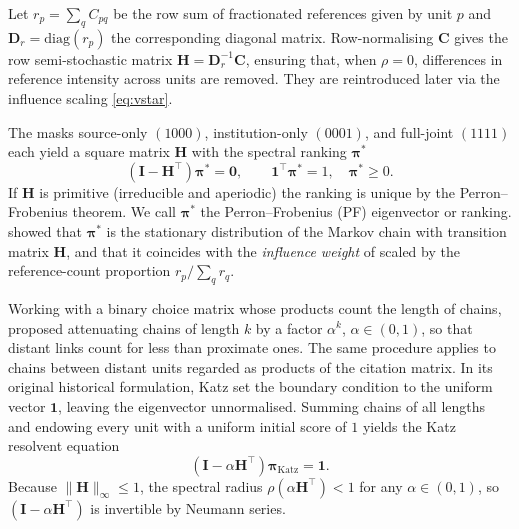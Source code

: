 Let $r_p=\sum_q C_{pq}$ be the row sum of fractionated references given by unit $p$
and $\mathbf{D}_r=\mathrm{diag}(r_p)$ the corresponding diagonal matrix.
Row-normalising $\mathbf{C}$ gives the row semi-stochastic matrix
$\mathbf{H}=\mathbf{D}_r^{-1}\mathbf{C}$, ensuring that, when $\rho = 0$, differences in reference intensity across units are removed. They are reintroduced later
via the influence scaling \eqref{eq:vstar}. 

The masks source-only $(1000)$, institution-only $(0001)$, and full-joint $(1111)$
each yield a square matrix $\mathbf{H}$ with the spectral
ranking $\boldsymbol{\pi}^*$ \citep[see][for an overview]{vignaSpectralRanking2016}
\begin{equation}
	(\mathbf{I} - \mathbf{H}^\top)\boldsymbol{\pi}^* = \mathbf{0},
	\qquad
	\mathbf{1}^\top\boldsymbol{\pi}^*=1,
	\quad
	\boldsymbol{\pi}^*\ge 0.
	\label{eq:eig}
\end{equation}
If $\mathbf{H}$ is primitive (irreducible and aperiodic) the ranking is unique by the
Perron--Frobenius theorem. We call $\boldsymbol{\pi}^*$ the Perron--Frobenius (PF) eigenvector or ranking. \textcite{gellerCitationInfluenceMethodology1978} showed that
$\boldsymbol{\pi}^*$ is the stationary distribution of the
Markov chain with transition matrix $\mathbf{H}$, and that it coincides
with the \textit{influence weight} of \textcite{pinskiCitationInfluenceJournal1976}
scaled by the reference-count proportion $r_p / \sum_q r_q$.

Working with a binary choice matrix whose products count the length of chains, \textcite{katzNewStatusIndex1953} proposed attenuating chains of length $k$ by a factor $\alpha^k$, $\alpha\in(0,1)$, so that distant links count for less than proximate ones. The same procedure applies to chains between distant units regarded as products of the citation matrix. In its original historical formulation, Katz set the boundary condition \citep{vignaSpectralRanking2016} to the uniform vector $\mathbf{1}$, leaving the eigenvector unnormalised.
Summing chains of all lengths and endowing every unit with a
uniform initial score of $1$ yields the Katz resolvent equation
\[
	(\mathbf{I} - \alpha\mathbf{H}^\top)\boldsymbol{\pi}_\text{Katz} = \mathbf{1}.
\]
Because $\|\mathbf{H}\|_\infty\leq 1$, the spectral radius $\rho(\alpha\mathbf{H}^\top)<1$ for any $\alpha\in(0,1)$, so $(\mathbf{I}-\alpha\mathbf{H}^\top)$ is invertible by Neumann series.


